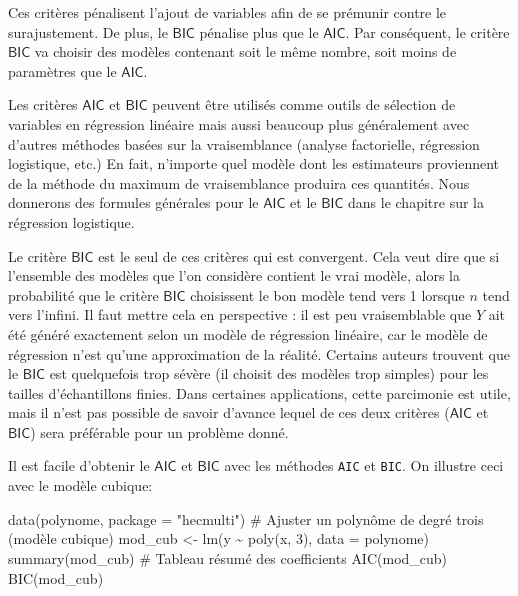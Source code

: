 \documentclass[
  11pt,
  letterpaper,
]{scrbook}
\newenvironment{Shaded}{\begin{snugshade}}{\end{snugshade}}
\newcommand{\AttributeTok}[1]{\textcolor[rgb]{0.40,0.45,0.13}{#1}}
\newcommand{\CommentTok}[1]{\textcolor[rgb]{0.37,0.37,0.37}{#1}}
\newcommand{\DecValTok}[1]{\textcolor[rgb]{0.68,0.00,0.00}{#1}}
\newcommand{\FunctionTok}[1]{\textcolor[rgb]{0.28,0.35,0.67}{#1}}
\newcommand{\NormalTok}[1]{\textcolor[rgb]{0.00,0.23,0.31}{#1}}
\newcommand{\OtherTok}[1]{\textcolor[rgb]{0.00,0.23,0.31}{#1}}
\newcommand{\SpecialCharTok}[1]{\textcolor[rgb]{0.37,0.37,0.37}{#1}}
\newcommand{\StringTok}[1]{\textcolor[rgb]{0.13,0.47,0.30}{#1}}
\theoremstyle{definition}
\theoremstyle{remark}
\begin{document}
Ces critères pénalisent l'ajout de variables afin de se prémunir contre
le surajustement. De plus, le \(\mathsf{BIC}\) pénalise plus que le
\(\mathsf{AIC}\). Par conséquent, le critère \(\mathsf{BIC}\) va choisir
des modèles contenant soit le même nombre, soit moins de paramètres que
le \(\mathsf{AIC}\).

Les critères \(\mathsf{AIC}\) et \(\mathsf{BIC}\) peuvent être utilisés
comme outils de sélection de variables en régression linéaire mais aussi
beaucoup plus généralement avec d'autres méthodes basées sur la
vraisemblance (analyse factorielle, régression logistique, etc.) En
fait, n'importe quel modèle dont les estimateurs proviennent de la
méthode du maximum de vraisemblance produira ces quantités. Nous
donnerons des formules générales pour le \(\mathsf{AIC}\) et le
\(\mathsf{BIC}\) dans le chapitre sur la régression logistique.

Le critère \(\mathsf{BIC}\) est le seul de ces critères qui est
convergent. Cela veut dire que si l'ensemble des modèles que l'on
considère contient le vrai modèle, alors la probabilité que le critère
\(\mathsf{BIC}\) choisissent le bon modèle tend vers 1 lorsque \(n\)
tend vers l'infini. Il faut mettre cela en perspective : il est peu
vraisemblable que \(Y\) ait été généré exactement selon un modèle de
régression linéaire, car le modèle de régression n'est qu'une
approximation de la réalité. Certains auteurs trouvent que le
\(\mathsf{BIC}\) est quelquefois trop sévère (il choisit des modèles
trop simples) pour les tailles d'échantillons finies. Dans certaines
applications, cette parcimonie est utile, mais il n'est pas possible de
savoir d'avance lequel de ces deux critères (\(\mathsf{AIC}\) et
\(\mathsf{BIC}\)) sera préférable pour un problème donné.

Il est facile d'obtenir le \(\mathsf{AIC}\) et \(\mathsf{BIC}\) avec les
méthodes \texttt{AIC} et \texttt{BIC}. On illustre ceci avec le modèle
cubique:

\begin{Shaded}
\begin{Highlighting}[]
\FunctionTok{data}\NormalTok{(polynome, }\AttributeTok{package =} \StringTok{"hecmulti"}\NormalTok{)}
\CommentTok{\# Ajuster un polynôme de degré trois (modèle cubique)}
\NormalTok{mod\_cub }\OtherTok{\textless{}{-}} \FunctionTok{lm}\NormalTok{(y }\SpecialCharTok{\textasciitilde{}} \FunctionTok{poly}\NormalTok{(x, }\DecValTok{3}\NormalTok{),}
              \AttributeTok{data =}\NormalTok{ polynome)}
\FunctionTok{summary}\NormalTok{(mod\_cub) }\CommentTok{\# Tableau résumé des coefficients}
\FunctionTok{AIC}\NormalTok{(mod\_cub)}
\FunctionTok{BIC}\NormalTok{(mod\_cub)}
\end{Highlighting}
\end{Shaded}
\end{document}
